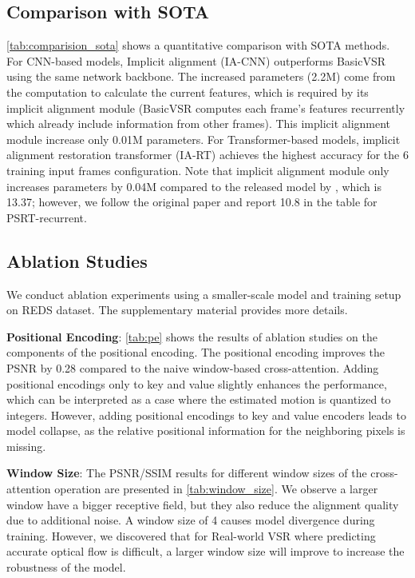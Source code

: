 \documentclass[10pt,twocolumn,letterpaper]{article}
\begin{document}
\subsection{Comparison with SOTA}
\vspace{-0.2em}
\cref{tab:comparision_sota} shows a quantitative comparison with SOTA methods. For CNN-based models, Implicit alignment (IA-CNN) outperforms BasicVSR using the same network backbone. The increased parameters (2.2M) come from the computation to calculate the current features, which is required by its implicit alignment module (BasicVSR computes each frame’s features recurrently which already include information from other frames). This implicit alignment module increase only 0.01M parameters. For Transformer-based models, implicit alignment restoration transformer (IA-RT) achieves the highest accuracy for the 6 training input frames configuration. Note that implicit alignment module only increases parameters by 0.04M compared to the released model by \cite{shi2022rethinking}, which is 13.37; however, we follow the original paper and report 10.8 in the table for PSRT-recurrent.
\vspace{-0.2em}
\subsection{Ablation Studies}
\vspace{-0.2em}
We conduct ablation experiments using a smaller-scale model and training setup on REDS dataset. The supplementary material provides more details.

\noindent \textbf{Positional Encoding}:
\cref{tab:pe} shows the results of ablation studies on the components of the positional encoding. The positional encoding improves the PSNR by 0.28 compared to the naive window-based cross-attention. Adding positional encodings only to key and value slightly enhances the performance, which can be interpreted as a case where the estimated motion is quantized to integers. However, adding positional encodings to key and value encoders leads to model collapse, as the relative positional information for the neighboring pixels is missing.




\noindent \textbf{Window Size}:
The PSNR/SSIM results for different window sizes of the cross-attention operation are presented in \cref{tab:window_size}. We observe a larger window have a bigger receptive field, but they also reduce the alignment quality due to additional noise. A window size of 4 causes model divergence during training. However, we discovered that for Real-world VSR where predicting accurate optical flow is difficult, a larger window size will improve to increase the robustness of the model.
\end{document}
